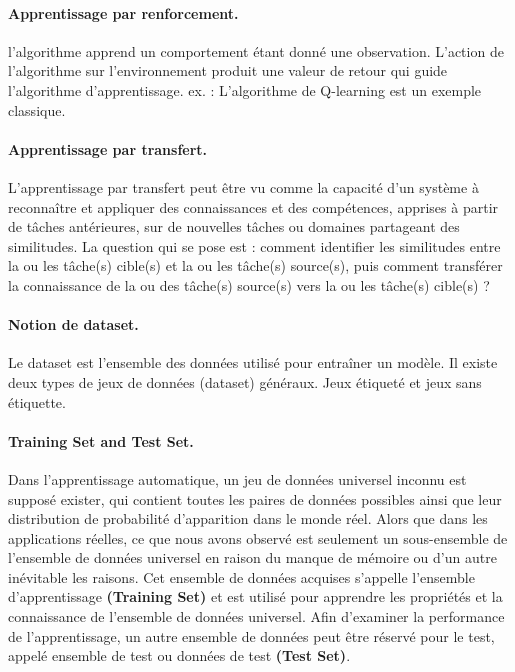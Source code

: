 \documentclass[12pt, french]{article}
\begin{document}
\paragraph{Apprentissage par renforcement.}l'algorithme apprend un comportement étant donné une observation. L'action de l'algorithme sur l'environnement produit une valeur de retour qui guide l'algorithme d'apprentissage.
ex. : L'algorithme de Q-learning est un exemple classique.
\paragraph{Apprentissage par transfert.}
L’apprentissage par transfert peut être vu comme la capacité d’un système à reconnaître et appliquer des connaissances et des compétences, apprises à partir de tâches antérieures, sur de nouvelles tâches ou domaines partageant des similitudes. La question qui se pose est : comment identifier les similitudes entre la ou les tâche(s) cible(s) et la ou les tâche(s) source(s), puis comment transférer la connaissance de la ou des tâche(s) source(s) vers la ou les tâche(s) cible(s) ?
\paragraph{Notion de dataset.}
Le dataset est l'ensemble des données utilisé pour entraîner un modèle. Il existe deux types de jeux de données (dataset) généraux. Jeux étiqueté et jeux sans étiquette.
\paragraph{Training Set and Test Set.}
Dans l'apprentissage automatique, un jeu de données universel inconnu est supposé exister, qui contient toutes les paires de données possibles ainsi que leur distribution de probabilité d'apparition dans le monde réel. Alors que dans les applications réelles, ce que nous avons observé est seulement un sous-ensemble de l'ensemble de données universel en raison du manque de mémoire ou d'un autre inévitable les raisons. Cet ensemble de données acquises s'appelle l'ensemble d'apprentissage \textbf{(Training Set)} et est utilisé pour apprendre les propriétés et la connaissance de l'ensemble de données universel. Afin d'examiner la performance de l'apprentissage, un autre ensemble de données peut être réservé pour le test, appelé ensemble de test ou données de test \textbf{(Test Set)}.\\
\end{document}
